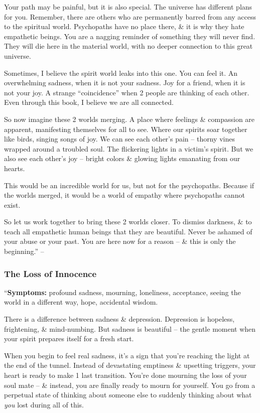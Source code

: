 \documentclass{article}
\numberwithin{equation}{section}
\begin{document}
Your path may be painful, but it is also special. The universe has different plans for you. Remember, there are others who are permanently barred from any access to the spiritual world. Psychopaths have no place there, \& it is why they hate empathetic beings. You are a nagging reminder of something they will never find. They will die here in the material world, with no deeper connection to this great universe.

Sometimes, I believe the spirit world leaks into this one. You can feel it. An overwhelming sadness, when it is not your sadness. Joy for a friend, when it is not your joy. A strange ``coincidence'' when 2 people are thinking of each other. Even through this book, I believe we are all connected.

So now imagine these 2 worlds merging. A place where feelings \& compassion are apparent, manifesting themselves for all to see. Where our spirits soar together like birds, singing songs of joy. We can see each other's pain -- thorny vines wrapped around a troubled soul. The flickering lights in a victim's spirit. But we also see each other's joy -- bright colors \& glowing lights emanating from our hearts.

This would be an incredible world for us, but not for the psychopaths. Because if the worlds merged, it would be a world of empathy where psychopaths cannot exist.

So let us work together to bring these 2 worlds closer. To dismiss darkness, \& to teach all empathetic human beings that they are beautiful. Never be ashamed of your abuse or your past. You are here now for a reason -- \& this is only the beginning.'' -- \cite[pp. 134--137]{MacKenzie2015}

\subsubsection{The Loss of Innocence}
``\textbf{Symptoms:} profound sadness, mourning, loneliness, acceptance, seeing the world in a different way, hope, accidental wisdom.

There is a difference between sadness \& depression. Depression is hopeless, frightening, \& mind-numbing. But sadness is beautiful -- the gentle moment when your spirit prepares itself for a fresh start.

When you begin to feel real sadness, it's a sign that you're reaching the light at the end of the tunnel. Instead of devastating emptiness \& upsetting triggers, your heart is ready to make 1 last transition. You're done mourning the loss of your soul mate -- \& instead, you are finally ready to mourn for yourself. You go from a perpetual state of thinking about someone else to suddenly thinking about what \textit{you} lost during all of this.
\end{document}
